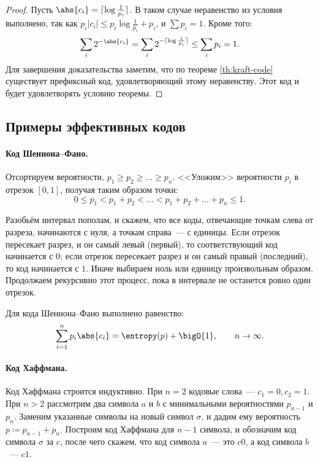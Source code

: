 \begin{proof}
    Пусть $\abs{c_i} = \lceil \log\frac{1}{p_i} \rceil$. В таком случае неравенство из условия выполнено,
    так как $p_i|c_i| \leq p_i\log\frac{1}{p_i} + p_i$, и $ \sum p_i = 1$. Кроме того:
    $$
    \sum_i 2^{-\abs{c_i}} = \sum_i 2^{-\lceil \log\frac{1}{p_i}\rceil} \le \sum_i p_i = 1.
    $$
    Для завершения доказательства заметим, что по теореме \ref{th:kraft-code} существует префиксный код,
    удовлетворяющий этому неравенству. Этот код и будет удовлетворять условию теоремы.
\end{proof}


\subsection{Примеры эффективных кодов}

\paragraph{Код Шеннона--Фано.}
Отсортируем вероятности, $ p_1 \ge p_2 \ge \dots \ge p_n$. <<Уложим>> вероятности $p_i$ в отрезок $[0,
1]$, получая таким образом точки:
$$
0 \le p_1 < p_1 + p_2 < \dots < p_1 + p_2 + \dots + p_n \le 1.
$$ 

Разобьём интервал пополам, и скажем, что все коды, отвечающие точкам слева от разреза, начинаются с нуля,
а точкам справа~--- с единицы. Если отрезок пересекает разрез, и он самый левый (первый), то
соответствующий код начинается с $0$; если отрезок пересекает разрез и он самый правый (последний), то
код начинается с $1$. Иначе выбираем ноль или единицу произвольным образом. Продолжаем рекурсивно этот
процесс, пока в интервале не останется ровно один отрезок. 

\begin{exercise}
    Для кода Шеннона--Фано выполнено равенство:
    $$
        \sum_{i = 1}^n p_i\abs{c_i} = \entropy(p) + \bigO{1}, \qquad n \to \infty.
    $$
\end{exercise}


\paragraph{Код Хаффмана.} Код Хаффмана строится индуктивно. При $n = 2$ кодовые слова~--- $c_1 = 0, c_2 =
1$. При $n > 2$ рассмотрим два символа $a$ и $b$ с минимальными вероятностями $p_{n - 1}$ и
$p_n$. Заменим указанные символы на новый символ $\sigma$, и дадим ему вероятность $p \coloneqq p_{n - 1}
+ p_n$. Построим код Хаффмана для $n - 1$ символа, и обозначим код символа $\sigma$ за $c$, после чего
скажем, что код символа $a$~--- это $c0$, а код символа $b$~--- $c1$.

